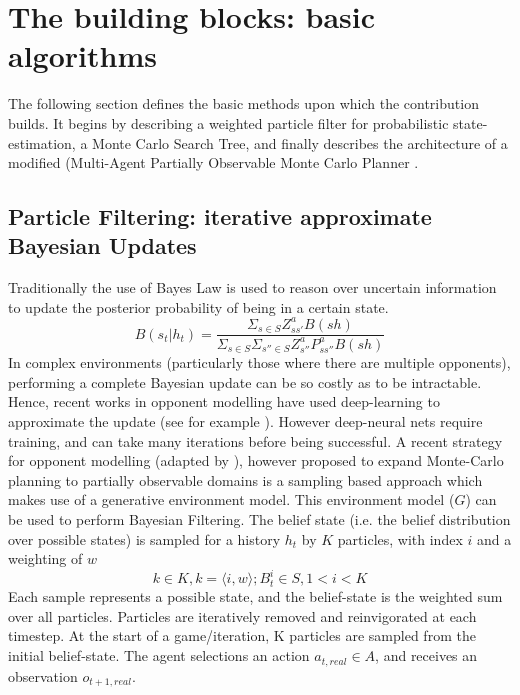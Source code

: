
\section{The building blocks: basic algorithms}
The following section defines the basic methods upon which the contribution builds. It begins by describing a weighted particle filter for probabilistic state-estimation, a Monte Carlo Search Tree, and finally describes the architecture of a modified (Multi-Agent Partially Observable Monte Carlo Planner \cite{Hayashi_et_al2020,Silver2010}.  
\subsection{Particle Filtering: iterative approximate Bayesian Updates}
Traditionally the use of Bayes Law is used to reason over uncertain information to update the posterior probability of being in a certain state.
\begin{equation}
    B(s_t|h_t) = 
     \frac{\Sigma_{s \in S} Z^{a}_{ss'}B(sh)}
    {\Sigma_{s\in S} \Sigma_{s''\in S}Z^{a}_{s''}P^{a}_{ss''}B(sh)}
\end{equation} 
In complex environments (particularly those where there are multiple opponents), performing a complete Bayesian update can be so costly as to be intractable. Hence, recent works in opponent modelling have used deep-learning to approximate the update (see for example \cite{he_om_DRL}). However deep-neural nets require training, and can take many iterations before being successful. A recent strategy for opponent modelling (adapted by \cite{Hayashi_et_al2020}), however proposed to expand Monte-Carlo planning to partially observable domains is a sampling based approach which makes use of a generative environment model. This environment model ($G$) can be used to perform Bayesian Filtering. 
\newline \newline
The belief state (i.e. the belief distribution over possible states) is sampled for a history $h_t$ by $K$ particles, with index $i$ and a weighting of $w$ 
\begin{equation}
    k \in K, k = \langle i, w \rangle; B^i_t \in S, 1 < i < K    
\end{equation}
Each sample represents a possible state, and the belief-state is the weighted sum over all particles. 
\newline \newline
Particles are iteratively removed and reinvigorated at each timestep. At the start of a game/iteration, K particles are sampled from the initial belief-state. The agent selections an action $a_{t, real} \in A$, and receives an observation $o_{t+1,real}$. 
